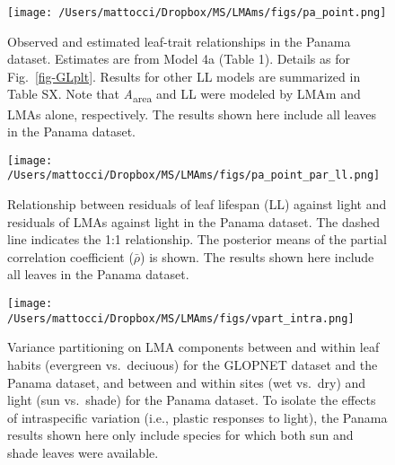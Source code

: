 \documentclass[
  12pt,
  a4paper,
,tablecaptionabove
]{scrartcl}
\begin{document}
\newpage

\begin{figure}

{\centering \texttt{[image: /Users/mattocci/Dropbox/MS/LMAms/figs/pa\_point.png]}

}

\caption{\label{fig-PAplt}Observed and estimated leaf-trait
relationships in the Panama dataset. Estimates are from Model 4a (Table
1). Details as for Fig.~\ref{fig-GLplt}. Results for other LL models are
summarized in Table SX. Note that \emph{A}\textsubscript{area} and LL
were modeled by LMAm and LMAs alone, respectively. The results shown
here include all leaves in the Panama dataset.}

\end{figure}

\newpage

\begin{figure}

{\centering \texttt{[image: /Users/mattocci/Dropbox/MS/LMAms/figs/pa\_point\_par\_ll.png]}

}

\caption{\label{fig-LLplt}Relationship between residuals of leaf
lifespan (LL) against light and residuals of LMAs against light in the
Panama dataset. The dashed line indicates the 1:1 relationship. The
posterior means of the partial correlation coefficient (\(\bar{\rho}\))
is shown. The results shown here include all leaves in the Panama
dataset.}

\end{figure}

\newpage

\begin{figure}

{\centering \texttt{[image: /Users/mattocci/Dropbox/MS/LMAms/figs/vpart\_intra.png]}

}

\caption{\label{fig-vpart}Variance partitioning on LMA components
between and within leaf habits (evergreen vs.~deciuous) for the GLOPNET
dataset and the Panama dataset, and between and within sites (wet
vs.~dry) and light (sun vs.~shade) for the Panama dataset. To isolate
the effects of intraspecific variation (i.e., plastic responses to
light), the Panama results shown here only include species for which
both sun and shade leaves were available.}

\end{figure}

\newpage
\end{document}
